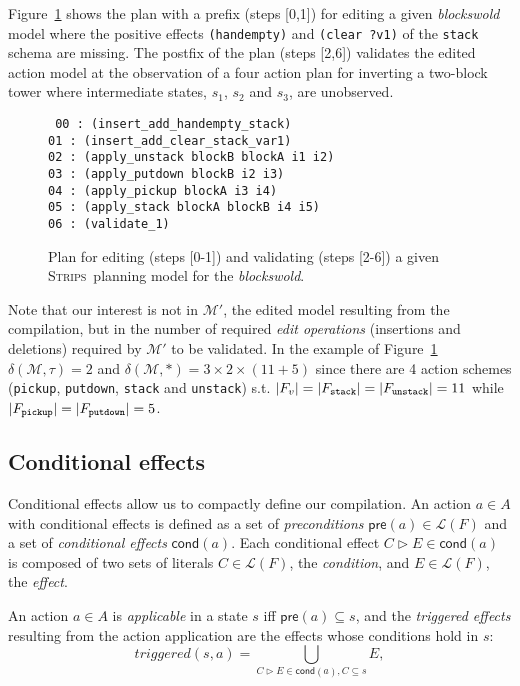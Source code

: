 \documentclass[letterpaper]{article} %
\newcommand{\pre}{\mathsf{pre}}     %
\newcommand{\cond}{\mathsf{cond}}   %
\newcommand{\strips}{\textsc{Strips}}     %
\begin{document}
Figure~\ref{fig:plan-pdistance} shows the plan with a prefix (steps [0,1]) for editing a given {\em blockswold} model where the positive effects {\tt\small (handempty)} and {\tt\small (clear ?v1)} of the {\tt\small stack} schema are missing. The postfix of the plan (steps [2,6]) validates the edited action model at the observation of a four action plan for inverting a two-block tower where intermediate states, $s_1$, $s_2$ and $s_3$, are unobserved. 
\begin{figure}
{\tt\scriptsize
00 : (insert\_add\_handempty\_stack)\\
01 : (insert\_add\_clear\_stack\_var1)\\
02 : (apply\_unstack blockB blockA i1 i2)\\
03 : (apply\_putdown blockB i2 i3)\\
04 : (apply\_pickup blockA i3 i4)\\
05 : (apply\_stack blockA blockB i4 i5)\\
06 : (validate\_1)
}
 \caption{\small Plan for editing (steps [0-1]) and validating (steps [2-6]) a given \strips\ planning model for the {\em blockswold}.}
\label{fig:plan-pdistance}
\end{figure}

Note that our interest is not in $\mathcal{M}'$, the edited model resulting from the compilation, but in the number of required {\em edit operations} (insertions and deletions) required by $\mathcal{M}'$ to be validated. In the example of Figure~\ref{fig:plan-pdistance} $\delta(\mathcal{M},\tau)=2$ and $\delta(\mathcal{M},*)=3\times 2\times (11+5)$ since there are 4 action schemes ({\small\tt pickup}, {\small\tt putdown}, {\small\tt stack} and {\small\tt unstack}) s.t. $|F_v|=|F_{\tt stack}|=|F_{\tt unstack}|=11$ while $|F_{\tt pickup}|=|F_{\tt putdown}|=5$. 


\subsection{Conditional effects}
Conditional effects allow us to compactly define our compilation. An action $a\in A$ with conditional effects is defined as a set of {\em preconditions} $\pre(a)\in\mathcal{L}(F)$ and a set of {\em conditional effects} $\cond(a)$. Each conditional effect $C\rhd E\in\cond(a)$ is composed of two sets of literals $C\in\mathcal{L}(F)$, the {\em condition}, and $E\in\mathcal{L}(F)$, the {\em effect}.

An action $a\in A$ is {\em applicable} in a state $s$ iff $\pre(a)\subseteq s$, and the {\em triggered effects} resulting from the action application are the effects whose conditions hold in $s$:
\[
triggered(s,a)=\bigcup_{C\rhd E\in\cond(a),C\subseteq s} E,
\]
\end{document}
